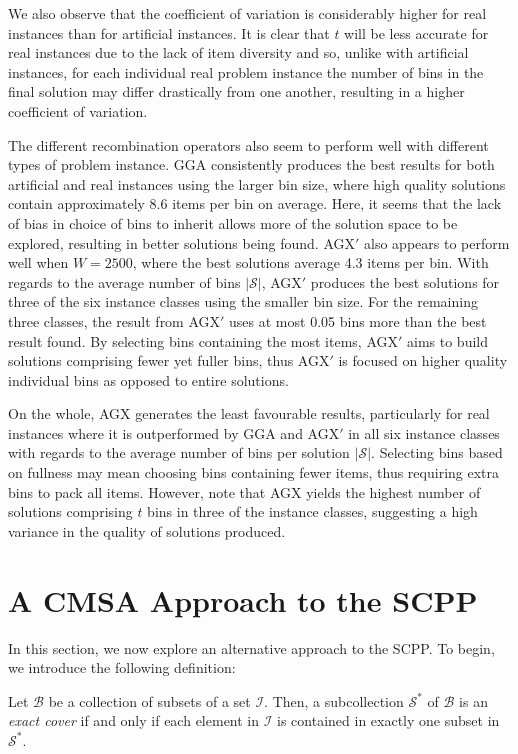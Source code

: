 \documentclass[a4paper,11pt,authoryear]{elsarticle}
\begin{document}
We also observe that the coefficient of variation is considerably higher for real instances than for artificial instances. It is clear that $t$ will be less accurate for real instances due to the lack of item diversity and so, unlike with artificial instances, for each individual real problem instance the number of bins in the final solution may differ drastically from one another, resulting in a higher coefficient of variation.

The different recombination operators also seem to perform well with different types of problem instance. GGA consistently produces the best results for both artificial and real instances using the larger bin size, where high quality solutions contain approximately 8.6 items per bin on average. Here, it seems that the lack of bias in choice of bins to inherit allows more of the solution space to be explored, resulting in better solutions being found. AGX$'$ also appears to perform well when $W=2500$, where the best solutions average 4.3 items per bin. With regards to the average number of bins $|\mathcal{S}|$, AGX$'$ produces the best solutions for three of the six instance classes using the smaller bin size. For the remaining three classes, the result from AGX$'$ uses at most 0.05 bins more than the best result found. By selecting bins containing the most items, AGX$'$ aims to build solutions comprising fewer yet fuller bins, thus AGX$'$ is focused on higher quality individual bins as opposed to entire solutions.

On the whole, AGX generates the least favourable results, particularly for real instances where it is outperformed by GGA and AGX$'$ in all six instance classes with regards to the average number of bins per solution $|\mathcal{S}|$. Selecting bins based on fullness may mean choosing bins containing fewer items, thus requiring extra bins to pack all items. However, note that AGX yields the highest number of solutions comprising $t$ bins in three of the instance classes, suggesting a high variance in the quality of solutions produced.

\section{A CMSA Approach to the SCPP}
\label{sec:cmsa}
\noindent In this section, we now explore an alternative approach to the SCPP. To begin, we introduce the following definition:

\begin{definition}
	Let $\mathcal{B}$ be a collection of subsets of a set $\mathcal{I}$. Then, a subcollection $\mathcal{S}^*$ of $\mathcal{B}$ is an \emph{exact cover} if and only if each element in $\mathcal{I}$ is contained in exactly one subset in $\mathcal{S}^*$.
	\label{defn:exactcover}
\end{definition}	
\end{document}

